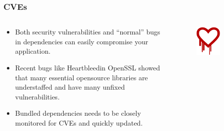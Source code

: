 \documentclass[aspectratio=169]{beamer}              %
\begin{document}
\begin{frame}
	\frametitle{CVEs}
	
	\begin{columns}
\begin{column}{0.6\textwidth}

	\begin{block}{}
		\begin{itemize}
			\item Both security vulnerabilities and ``normal'' bugs in dependencies can easily compromise your application.
			\item Recent bugs like Heartbleed\footnotemark in OpenSSL showed that many essential opensource libraries are understaffed and have many unfixed vulnerabilities.
			\item Bundled dependencies needs to be closely monitored for CVEs and quickly updated.
		\end{itemize}
	\end{block}

\end{column}

\begin{column}{0.4\textwidth}
	\begin{figure}[ht!]
	\begin{center}
  	  \includegraphics[width=0.65\textwidth]{img/heartbleed.png}
	\end{center}
	\end{figure}
\end{column}
\end{columns}

\end{frame}
\end{document}
